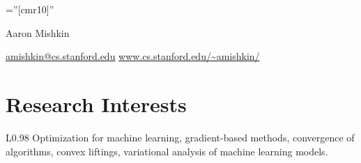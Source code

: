 \documentclass[10pt]{article}
\newcommand{\spacing}{\vspace{0.5cm}}
\begin{document}

\font\fb=''[cmr10]'' %

\par{\centering
    {\Huge Aaron Mishkin} \par \vspace{0.25cm}
    {\href{mailto:amishkin@cs.stanford.edu}{amishkin@cs.stanford.edu} \hspace{0.2cm} \href{https://cs.stanford.edu/~amishkin/}{www.cs.stanford.edu/\~{}amishkin/}}
    \par}

\spacing

\section{Research Interests}

\begin{longtable}{L{0.98\linewidth}}
    Optimization for machine learning, gradient-based methods, convergence of
    algorithms, convex liftings, variational analysis of machine learning
    models.
\end{longtable}

\end{document}
